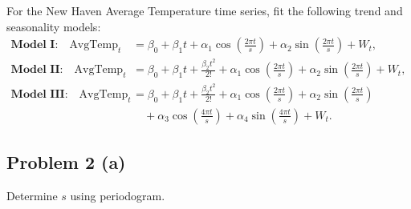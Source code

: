 \documentclass[
  10pt,
]{extarticle}
\begin{document}
\begin{problem}[Problem 2]
For the New Haven Average Temperature time series, fit the following trend and seasonality models:
\begin{align*}
\textbf{Model I:}\quad
\text{AvgTemp}_t
&= \beta_0 + \beta_1 t
+ \alpha_1 \cos\!\left(\frac{2\pi t}{s}\right) + \alpha_2 \sin\!\left(\frac{2\pi t}{s}\right) + W_t, \\
\textbf{Model II:}\quad
\text{AvgTemp}_t
&= \beta_0 + \beta_1 t
+ \frac{\beta_2 t^2}{2!}
+ \alpha_1 \cos\!\left(\frac{2\pi t}{s}\right) + \alpha_2 \sin\!\left(\frac{2\pi t}{s}\right) + W_t, \\
\textbf{Model III:}\quad
\text{AvgTemp}_t
&= \beta_0 + \beta_1 t
+ \frac{\beta_2 t^2}{2!}
+ \alpha_1 \cos\!\left(\frac{2\pi t}{s}\right)
+ \alpha_2 \sin\!\left(\frac{2\pi t}{s}\right) \\
&\quad + \alpha_3 \cos\!\left(\frac{4\pi t}{s}\right)
+ \alpha_4 \sin\!\left(\frac{4\pi t}{s}\right)
+ W_t.
\end{align*}
\end{problem}

\newpage

\subsection{Problem 2 (a)}\label{problem-2-a}

\begin{problem}[Problem 2 (a)]
Determine \(s\) using periodogram.
\end{problem}
\end{document}
